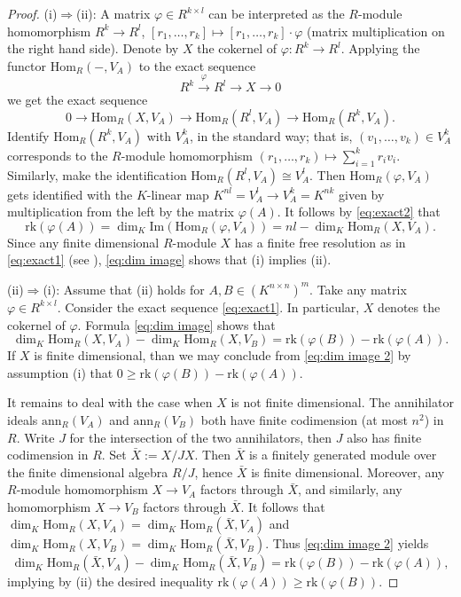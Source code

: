 \documentclass[12pt]{amsart}
\newcommand{\field}{K}
\renewcommand{\hom}{\mathrm{Hom}}
\newcommand{\rank}{\mathrm{rk}}
\begin{document}
\begin{proof} (i)$\Rightarrow$(ii): 
A matrix $\varphi\in R^{k\times l}$ can be interpreted as the $R$-module 
homomorphism $R^k\to R^l$, $[r_1,\dots,r_k]\mapsto [r_1,\dots,r_k]\cdot \varphi$ 
(matrix multiplication on the right hand side). 
Denote by $X$ the cokernel of $\varphi:R^k\to R^l$. 
Applying the functor $\hom_R(-,V_A)$ to the exact sequence 
\begin{equation}\label{eq:exact1} 
R^k\stackrel{\varphi}\to R^l\to X\to 0\end{equation}
we get the exact sequence 
\begin{equation} \label{eq:exact2} 
0\to \hom_R(X,V_A)\to \hom_R(R^l,V_A)\to \hom_R(R^k,V_A).
\end{equation}
Identify $\hom_R(R^k,V_A)$ with $V_A^k$, in the standard way; that is, 
$(v_1,\dots,v_k)\in V_A^k$ corresponds to the $R$-module homomorphism 
$(r_1,\dots,r_k)\mapsto \sum_{i=1}^k r_iv_i$. Similarly, make the identification 
$\hom_R(R^l,V_A)\cong V_A^l$. Then 
$\hom_R(\varphi,V_A)$ gets identified with the $\field$-linear map 
$\field^{nl}=V_A^l\to V_A^k=\field^{nk}$ given by 
multiplication from the left by the matrix $\varphi(A)$. 
It follows by \eqref{eq:exact2} that 
\begin{equation}\label{eq:dim image}
\rank(\varphi(A))=\dim_\field\mathrm{Im}(\hom_R(\varphi,V_A))=
nl-\dim_\field\hom_R(X,V_A).
\end{equation} 
Since any finite dimensional $R$-module $X$ has a finite free resolution as in \eqref{eq:exact1} 
(see \cite[P. 458, Corollary]{lewin}), 
\eqref{eq:dim image} shows that (i) implies (ii).  

(ii)$\Rightarrow$(i): 
Assume that (ii) holds for $A,B\in (\field^{n\times n})^m$.   
Take any matrix $\varphi\in R^{k\times l}$. Consider the exact sequence \eqref{eq:exact1}. 
In particular, $X$ denotes the cokernel  of $\varphi$. 
Formula \eqref{eq:dim image} shows that 
\begin{equation}\label{eq:dim image 2}
\dim_\field\hom_R(X,V_A)-\dim_\field\hom_R(X,V_B)=\rank(\varphi(B))-\rank(\varphi(A)).\end{equation} 
If $X$ is finite dimensional, than we may conclude from \eqref{eq:dim image 2} by assumption (i) that 
$0\ge \rank(\varphi(B))-\rank(\varphi(A))$. 

It remains to deal with the case when $X$ is not finite dimensional. 
The annihilator ideals $\mathrm{ann}_R(V_A)$ and $\mathrm{ann}_R(V_B)$ 
both have finite codimension (at most $n^2$) in $R$. Write $J$ for the intersection of the two annihilators, 
then $J$ also has finite codimension in $R$. Set $\bar X:=X/JX$. Then $\bar X$ is a finitely generated module 
over the finite dimensional algebra $R/J$, hence $\bar X$ is finite dimensional. Moreover, any $R$-module 
homomorphism $X\to V_A$ factors through $\bar X$, and similarly, any homomorphism $X\to V_B$ factors through $\bar X$. 
It follows that $\dim_\field\hom_R(X,V_A)=\dim_\field\hom_R(\bar X,V_A)$ 
and $\dim_\field\hom_R(X,V_B)=\dim_\field\hom_R(\bar X,V_B)$. 
Thus \eqref{eq:dim image 2} yields 
\[\dim_\field\hom_R(\bar X,V_A)-\dim_\field\hom_R(\bar X,V_B)=\rank(\varphi(B))-\rank(\varphi(A)),\] 
implying by (ii) the desired inequality $\rank(\varphi(A))\ge \rank(\varphi(B))$. 


\end{proof}
\end{document}
